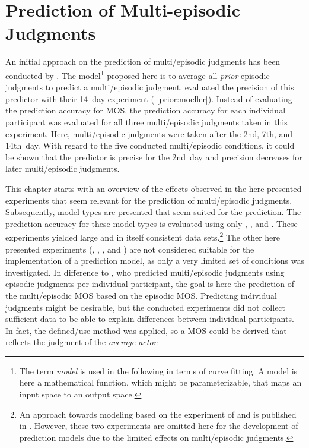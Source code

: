 

\chapter{Prediction of Multi-episodic Judgments}\label{chap:modeling}
An initial approach on the prediction of multi\-/episodic judgments has been conducted by \citet{moller_single-call_2011}.
The model\footnote{The term \emph{model} is used in the following in terms of curve fitting. A model is here a mathematical function, which might be parameterizable, that maps an input space to an output space.} proposed here is to average all \emph{prior} episodic judgments to predict a multi\-/episodic judgment.
\citet{moller_single-call_2011} evaluated the precision of this predictor with their 14~day experiment (\cf{} \autoref{prior:moeller}).
Instead of evaluating the prediction accuracy for \ac{MOS}, the prediction accuracy for each individual participant was evaluated for all three multi\-/episodic judgments taken in this experiment.
Here, multi\-/episodic judgments were taken after the 2nd, 7th, and 14th~day.
With regard to the five conducted multi\-/episodic conditions, it could be shown that the predictor is precise for the 2nd~day and precision decreases for later multi\-/episodic judgments.

This chapter starts with an overview of the effects observed in the here presented experiments that seem relevant for the prediction of multi\-/episodic judgments.
Subsequently, model types are presented that seem suited for the prediction.
The prediction accuracy for these model types is evaluated using only , \EIIa{}, and .
These experiments yielded large and in itself consistent data sets.\footnote{An approach towards modeling based on the experiment of \citet{moller_single-call_2011} and  is published in \citet{guse_modelling_2014}. However, these two experiments are omitted here for the development of prediction models due to the limited effects on multi\-/episodic judgments.}
The other here presented experiments (\EIIb{}, , , and ) are not considered suitable for the implementation of a prediction model, as only a very limited set of conditions was investigated.
In difference to \citet{moller_single-call_2011}, who predicted multi\-/episodic judgments using episodic judgments per individual participant, the goal is here the prediction of the multi\-/episodic \ac{MOS} based on the episodic \ac{MOS}.
Predicting individual judgments might be desirable, but the conducted experiments did not collect sufficient data to be able to explain differences between individual participants.
In fact, the defined\-/use method was applied, so a \ac{MOS} could be derived that reflects the judgment of the \emph{average actor}.


